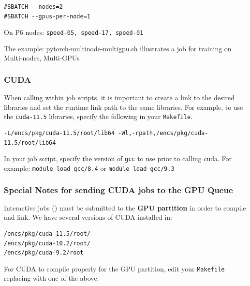 \begin{verbatim}
#SBATCH --nodes=2
#SBATCH --gpus-per-node=1
\end{verbatim}

On P6 nodes: \texttt{speed-05, speed-17, speed-01}

The example: 
  \href{https://github.com/NAG-DevOps/speed-hpc/blob/master/src/pytorch-multinode-multigpu.sh}
  {pytorch-multinode-multigpu.sh}
illustrates a job for training on Multi-nodes, Multi-GPUs

\subsubsection{CUDA}

When calling  within job scripts, it is important to create a link to
the desired  libraries and set the runtime link path to the same libraries. 
For example, to use the \texttt{cuda-11.5} libraries, specify the following in 
your \texttt{Makefile}.

\begin{verbatim}
-L/encs/pkg/cuda-11.5/root/lib64 -Wl,-rpath,/encs/pkg/cuda-11.5/root/lib64
\end{verbatim}

In your job script, specify the version of \texttt{gcc} to use prior to calling 
cuda. For example: 
   \texttt{module load gcc/8.4}
or
   \texttt{module load gcc/9.3}

\subsubsection{Special Notes for sending CUDA jobs to the GPU Queue}

Interactive 
jobs () must be submitted to the \textbf{GPU partition} in order to compile 
and link.
%
We have several versions of CUDA installed in:
\begin{verbatim}
/encs/pkg/cuda-11.5/root/
/encs/pkg/cuda-10.2/root/
/encs/pkg/cuda-9.2/root
\end{verbatim}

For CUDA to compile properly for the GPU partition, edit your \texttt{Makefile}
replacing  with one of the above.

